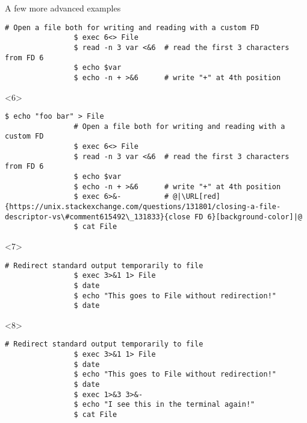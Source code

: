 \begin{frame}[fragile]{A few more advanced examples}
\begin{overlayarea}{\textwidth}{0.38\textheight}
\begin{onlyenv}
\begin{lstlisting}[style=MyBash, numbers=none, xrightmargin=3mm]
                # Open a file both for writing and reading with a custom FD
                $ exec 6<> File
                $ read -n 3 var <&6  # read the first 3 characters from FD 6
                $ echo $var 
                $ echo -n + >&6      # write "+" at 4th position
            \end{lstlisting}
        \end{onlyenv}
        \begin{onlyenv}<6>
            \begin{lstlisting}[style=MyBash, numbers=none, xrightmargin=3mm]
                $ echo "foo bar" > File
                # Open a file both for writing and reading with a custom FD
                $ exec 6<> File
                $ read -n 3 var <&6  # read the first 3 characters from FD 6
                $ echo $var 
                $ echo -n + >&6      # write "+" at 4th position
                $ exec 6>&-          # @|\URL[red]{https://unix.stackexchange.com/questions/131801/closing-a-file-descriptor-vs\#comment615492\_131833}{close FD 6}[background-color]|@
                $ cat File
            \end{lstlisting}
        \end{onlyenv}
        \begin{onlyenv}<7>
            \begin{lstlisting}[style=MyBash, numbers=none, xrightmargin=3mm]
                # Redirect standard output temporarily to file
                $ exec 3>&1 1> File
                $ date
                $ echo "This goes to File without redirection!"
                $ date
            \end{lstlisting}
        \end{onlyenv}
        \begin{onlyenv}<8>
            \begin{lstlisting}[style=MyBash, numbers=none, xrightmargin=3mm]
                # Redirect standard output temporarily to file
                $ exec 3>&1 1> File
                $ date
                $ echo "This goes to File without redirection!"
                $ date
                $ exec 1>&3 3>&-
                $ echo "I see this in the terminal again!"
                $ cat File
            \end{lstlisting}
        \end{onlyenv}
    \end{overlayarea}
    \begin{center}
        \begin{tikzpicture}

\end{tikzpicture}
\end{center}
\end{frame}

